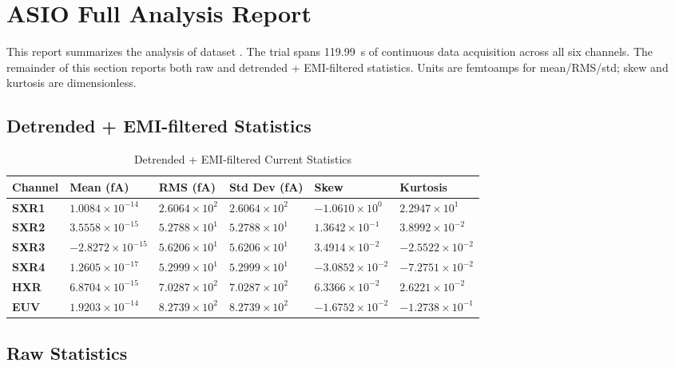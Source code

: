 \documentclass[12pt]{article}
\begin{document}
\section{ASIO Full Analysis Report}

This report summarizes the analysis of dataset . The trial spans 119.99~s of continuous data acquisition across all six channels.
The remainder of this section reports both raw and detrended + EMI-filtered
statistics. Units are femtoamps for mean/RMS/std; skew and kurtosis are
dimensionless.

\subsection{Detrended + EMI-filtered Statistics}

\begin{table}[H]
\centering
\caption{Detrended + EMI-filtered Current Statistics} \label{tab:full_det_stats}
\begin{tabular}{|C{0.9in}|C{1.08in}|C{1.08in}|C{1.08in}|C{1.08in}|C{1.08in}|}
\hline
\textbf{Channel} & \textbf{Mean (fA)} & \textbf{RMS (fA)} & \textbf{Std Dev (fA)} & \textbf{Skew} & \textbf{Kurtosis} \\
\hline
\textbf{SXR1} & $1.0084 \times 10^{-14}$ & $2.6064 \times 10^{2}$ & $2.6064 \times 10^{2}$ & $-1.0610 \times 10^{0}$ & $2.2947 \times 10^{1}$ \\
\hline
\textbf{SXR2} & $3.5558 \times 10^{-15}$ & $5.2788 \times 10^{1}$ & $5.2788 \times 10^{1}$ & $1.3642 \times 10^{-1}$ & $3.8992 \times 10^{-2}$ \\
\hline
\textbf{SXR3} & $-2.8272 \times 10^{-15}$ & $5.6206 \times 10^{1}$ & $5.6206 \times 10^{1}$ & $3.4914 \times 10^{-2}$ & $-2.5522 \times 10^{-2}$ \\
\hline
\textbf{SXR4} & $1.2605 \times 10^{-17}$ & $5.2999 \times 10^{1}$ & $5.2999 \times 10^{1}$ & $-3.0852 \times 10^{-2}$ & $-7.2751 \times 10^{-2}$ \\
\hline
\textbf{HXR} & $6.8704 \times 10^{-15}$ & $7.0287 \times 10^{2}$ & $7.0287 \times 10^{2}$ & $6.3366 \times 10^{-2}$ & $2.6221 \times 10^{-2}$ \\
\hline
\textbf{EUV} & $1.9203 \times 10^{-14}$ & $8.2739 \times 10^{2}$ & $8.2739 \times 10^{2}$ & $-1.6752 \times 10^{-2}$ & $-1.2738 \times 10^{-1}$ \\
\hline
\end{tabular}
\end{table}


\subsection{Raw Statistics}
\end{document}
